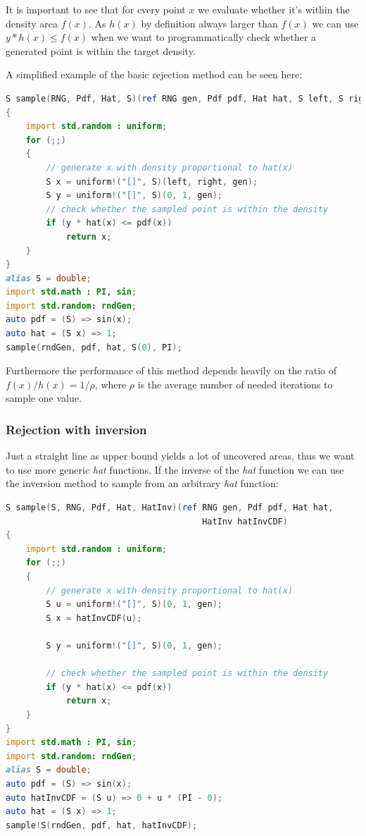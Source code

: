 \documentclass[]{article}
\begin{document}
It is important to see that for every point $x$ we evaluate whether it's within the density area $f(x)$. As $h(x)$ by definition always larger than $f(x)$ we can use $y * h(x) \leq f(x)$ when we want to programmatically check whether a generated point is within the target density.

A simplified example of the basic rejection method can be seen here:

\begin{minipage}{\linewidth}
\begin{lstlisting}[language=D]
S sample(RNG, Pdf, Hat, S)(ref RNG gen, Pdf pdf, Hat hat, S left, S right)
{
    import std.random : uniform;
    for (;;)
    {
        // generate x with density proportional to hat(x)
        S x = uniform!("[]", S)(left, right, gen);
        S y = uniform!("[]", S)(0, 1, gen);
        // check whether the sampled point is within the density
        if (y * hat(x) <= pdf(x))
            return x;
    }
}
alias S = double;
import std.math : PI, sin;
import std.random: rndGen;
auto pdf = (S) => sin(x);
auto hat = (S x) => 1;
sample(rndGen, pdf, hat, S(0), PI);
\end{lstlisting}
\end{minipage}

Furthermore the performance of this method depends heavily on the ratio of $f(x) / h(x) = 1 / \rho$, where $\rho$ is the average number of needed iterations to sample one value.

\subsubsection{Rejection with inversion}

Just a straight line as upper bound yields a lot of uncovered areas, thus we want to use more generic \textit{hat} functions. If the inverse of the \textit{hat} function we can use the inversion method to sample from an arbitrary \textit{hat} function:

\begin{minipage}{0.9\linewidth}
\begin{lstlisting}[language=D]
S sample(S, RNG, Pdf, Hat, HatInv)(ref RNG gen, Pdf pdf, Hat hat,
                                       HatInv hatInvCDF)
{
    import std.random : uniform;
    for (;;)
    {
        // generate x with density proportional to hat(x)
        S u = uniform!("[]", S)(0, 1, gen);
        S x = hatInvCDF(u);
       
        S y = uniform!("[]", S)(0, 1, gen);

        // check whether the sampled point is within the density
        if (y * hat(x) <= pdf(x))
            return x;
    }
}
import std.math : PI, sin;
import std.random: rndGen;
alias S = double;
auto pdf = (S) => sin(x);
auto hatInvCDF = (S u) => 0 + u * (PI - 0);
auto hat = (S x) => 1;
sample!S(rndGen, pdf, hat, hatInvCDF);
\end{lstlisting}
\end{minipage}
\end{document}
